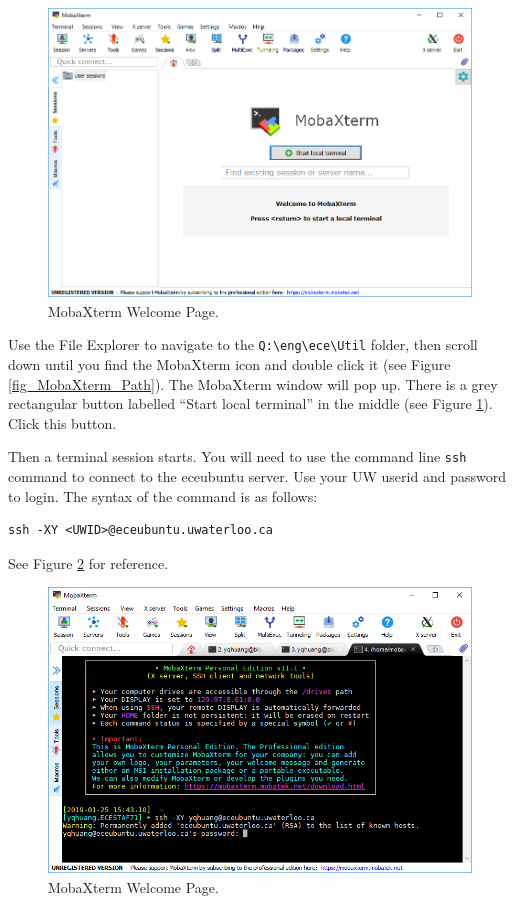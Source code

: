 \begin{figure}[!htb]
  \centering
  \includegraphics[width=6in]{img/lab0/MobaXterm/MobaXterm_Start_Page}
  \caption{MobaXterm Welcome Page.}
  \label{fig_MobaXterm_Start_Page}
\end{figure}

Use the File Explorer to navigate to the \verb+Q:\eng\ece\Util+ folder, then scroll down until you find the MobaXterm icon and double click it (see Figure \ref{fig_MobaXterm_Path}). The MobaXterm window will pop up. There is a grey rectangular button labelled ``Start local terminal'' in the middle (see Figure \ref{fig_MobaXterm_Start_Page}). Click this button.

Then a terminal session starts. You will need to use the command line \verb+ssh+ command to connect to the eceubuntu server. Use your UW userid and password to login. The syntax of the command is as follows:
\begin{lstlisting}[style=bash]
ssh -XY <UWID>@eceubuntu.uwaterloo.ca
\end{lstlisting}
See Figure \ref{fig_MobaXterm_Login_Password} for reference.
\begin{figure}[!htb]
  \centering
  \includegraphics[width=6in]{img/lab0/MobaXterm/MobaXterm_Login_Password}
  \caption{MobaXterm Welcome Page.}
  \label{fig_MobaXterm_Login_Password}
\end{figure}


